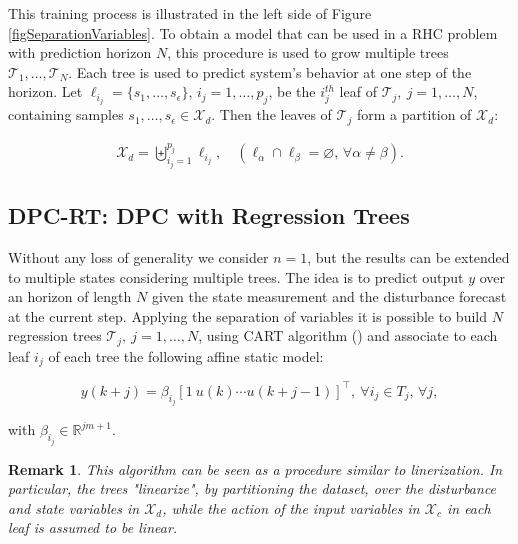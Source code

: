 \documentclass[letterpaper, 10 pt, conference]{ifacconf}  %
\newtheorem{remark}{Remark}
\begin{document}
This training process is illustrated in the left side of Figure \ref{figSeparationVariables}. 
To obtain a model that can be used in a RHC problem with prediction horizon $N$, this procedure is used to grow multiple trees $\mathcal{T}_1,\ldots,\mathcal{T}_N$. Each tree is used to predict system's behavior at one step of the horizon.
Let $\ell_{i_j} = \{s_1,\ldots,s_\epsilon\}$, $i_j=1,\ldots,p_j$, be the $i_j^{th}$ leaf of $\mathcal{T}_j,\ j = 1,\ldots,N$, containing samples $s_1,\ldots,s_\epsilon \in \mathcal{X}_d$. Then the leaves of $\mathcal{T}_j$ form a partition of $\mathcal{X}_d$:

\begin{align}\label{distSetPartition}
	\mathcal{X}_d=\biguplus_{i_j=1}^{p_j}{\ell_{i_j}}, \quad \left(\ell_{\alpha}\cap \ell_{\beta}=\varnothing,\,\forall \alpha\neq \beta \right).
\end{align}

\subsection{DPC-RT: DPC with Regression Trees}
Without any loss of generality we consider $n=1$, but the results can be extended to multiple states considering multiple trees. The idea is to predict output $y$ over an horizon of length $N$ given the state measurement and the disturbance forecast at the current step. Applying the separation of variables it is possible to build $N$ regression trees $\mathcal{T}_j,\ j=1,\ldots,N$, using CART algorithm (\cite{Breiman1984classification}) and associate to each leaf $i_j$ of each tree the following affine static model:

\small
\begin{equation}\label{eqAffineModel}
	y(k+j) = \beta_{i_j}[1\ u(k) \cdots u(k+j-1)]^\top,\ \forall i_j\in T_j,\,\forall j,
\end{equation}
\normalsize

with $\beta_{i_j}\in\mathbb{R}^{jm+1}$.

\begin{remark}
	This algorithm can be seen as a procedure similar to linerization. In particular, the trees "linearize", by partitioning the dataset, over the disturbance and state variables in $\mathcal{X}_d$, while the action of the input variables in $\mathcal{X}_c$ in each leaf is assumed to be linear.
\end{remark}
\end{document}
